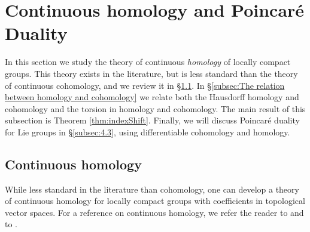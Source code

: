 \documentclass[12pt,reqno]{amsart}
\theoremstyle{definition}
\begin{document}
\section{Continuous homology and Poincar\'e Duality}\label{sec:4}
In this section we study the theory of continuous \emph{homology} of locally compact groups. This theory exists in the literature, but is less standard than the theory of continuous cohomology, and we review it in \S\ref{subsec:4.1}. In \S\ref{subsec:The relation between homology and cohomology} we relate both the Hausdorff homology and cohomology and the torsion in homology and cohomology. The main result of this subsection is Theorem \ref{thm:indexShift}. 
Finally, we will discuss Poincar\'e duality for Lie groups in \S\ref{subsec:4.3}, using differentiable cohomology and homology.

\subsection{Continuous homology}\label{subsec:4.1}
While less standard in the literature than cohomology, one can develop a theory of continuous homology for locally compact groups with coefficients in topological vector spaces. For a reference on continuous homology, we refer the reader to \cite{BlancHomology} and to \cite[\S C.16]{Petersen}.
\end{document}
